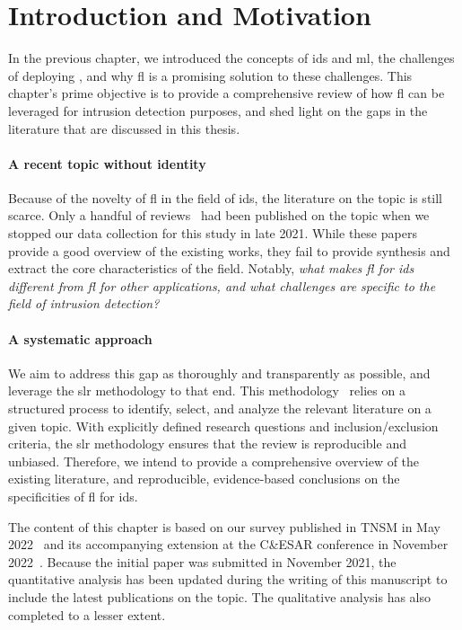 \section{Introduction and Motivation\label{sec:sota.intro}}

In the previous chapter, we introduced the concepts of \acrfull{ids} and \acrfull{ml}, the challenges of deploying , and why \acrfull{fl} is a promising solution to these challenges. 
This chapter's prime objective is to provide a comprehensive review of how \gls{fl} can be leveraged for intrusion detection purposes, and shed light on the gaps in the literature that are discussed in this thesis.

\paragraph{A recent topic without identity}

Because of the novelty of \gls{fl} in the field of \gls{ids}, the literature on the topic is still scarce.
Only a handful of reviews~\cite{alazab_FederatedLearningCybersecurity_2021,agrawal_FederatedLearningIntrusion_2021,campos_EvaluatingFederatedLearning_2021} had been published on the topic when we stopped our data collection for this study in late 2021.
While these papers provide a good overview of the existing works, they fail to provide synthesis and extract the core characteristics of the field.
Notably, \emph{what makes \gls{fl} for \gls{ids} different from \gls{fl} for other applications, and what challenges are specific to the field of intrusion detection?}


\paragraph{A systematic approach}

We aim to address this gap as thoroughly and transparently as possible, and leverage the \acrfull{slr} methodology to that end.
This methodology~\cite{kitchenham_Guidelinesperformingsystematic_2007} relies on a structured process to identify, select, and analyze the relevant literature on a given topic.
With explicitly defined research questions and inclusion/exclusion criteria, the \gls{slr} methodology ensures that the review is reproducible and unbiased.
Therefore, we intend to provide a comprehensive overview of the existing literature, and reproducible, evidence-based conclusions on the specificities of \gls{fl} for \gls{ids}.

The content of this chapter is based on our survey published in TNSM in May 2022~\cite{lavaur_EvolutionFederatedLearningbased_2022} and its accompanying extension at the C\&ESAR conference in November 2022~\cite{lavaur_Federatedlearningenabler_2022}.
Because the initial paper was submitted in November 2021, the quantitative analysis has been updated during the writing of this manuscript to include the latest publications on the topic.
The qualitative analysis has also completed to a lesser extent.

